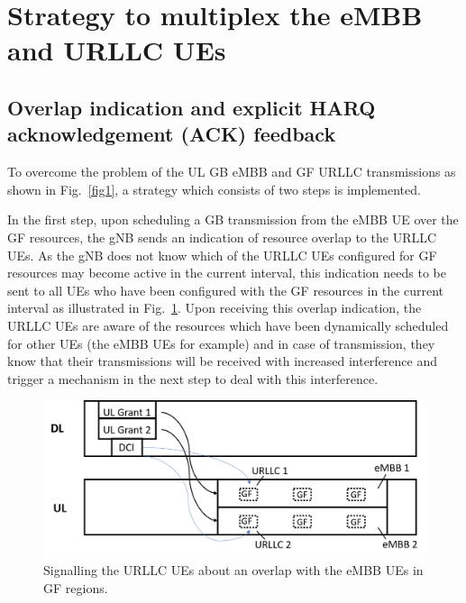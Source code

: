 \documentclass[conference]{IEEEtran}
\begin{document}

\section{Strategy to multiplex the eMBB and URLLC UEs}\label{II}

\subsection{Overlap indication and explicit HARQ acknowledgement (ACK) feedback}\label{IIAA}
To overcome the problem of the UL GB eMBB and GF URLLC transmissions as shown in Fig.~\ref{fig1}, a strategy which consists of two steps is implemented. 

In the first step, upon scheduling a GB transmission from the eMBB UE over the GF resources, the gNB sends an indication of resource overlap to the URLLC UEs. As the gNB does not know which of the URLLC UEs configured for GF resources may become active in the current interval, this indication needs to be sent to all UEs who have been configured with the GF resources in the current interval as illustrated in Fig.~\ref{fig2}. Upon receiving this overlap indication, the URLLC UEs are aware of the resources which have been dynamically scheduled for other UEs (the eMBB UEs for example) and in case of transmission, they know that their transmissions will be received with increased interference and trigger a mechanism in the next step to deal with this interference.

\begin{figure}[htbp]
\centerline{\includegraphics[scale=0.33]{fig2.png}}
\caption{Signalling the URLLC UEs about an overlap with the eMBB UEs in GF regions.}
\label{fig2}
\end{figure}
\end{document}
